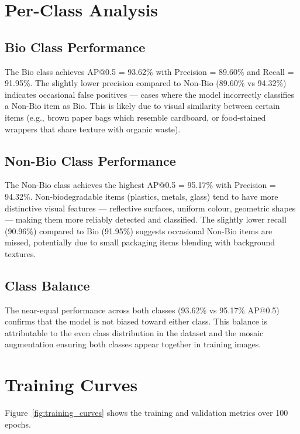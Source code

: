 \section{Per-Class Analysis}

\subsection{Bio Class Performance}

The Bio class achieves AP@0.5 = 93.62\% with Precision = 89.60\% and Recall = 91.95\%. The slightly lower precision compared to Non-Bio (89.60\% vs 94.32\%) indicates occasional false positives — cases where the model incorrectly classifies a Non-Bio item as Bio. This is likely due to visual similarity between certain items (e.g., brown paper bags which resemble cardboard, or food-stained wrappers that share texture with organic waste).

\subsection{Non-Bio Class Performance}

The Non-Bio class achieves the highest AP@0.5 = 95.17\% with Precision = 94.32\%. Non-biodegradable items (plastics, metals, glass) tend to have more distinctive visual features — reflective surfaces, uniform colour, geometric shapes — making them more reliably detected and classified. The slightly lower recall (90.96\%) compared to Bio (91.95\%) suggests occasional Non-Bio items are missed, potentially due to small packaging items blending with background textures.

\subsection{Class Balance}

The near-equal performance across both classes (93.62\% vs 95.17\% AP@0.5) confirms that the model is not biased toward either class. This balance is attributable to the even class distribution in the dataset and the mosaic augmentation ensuring both classes appear together in training images.

\section{Training Curves}
\label{sec:training_curves}

Figure~\ref{fig:training_curves} shows the training and validation metrics over 100 epochs.

